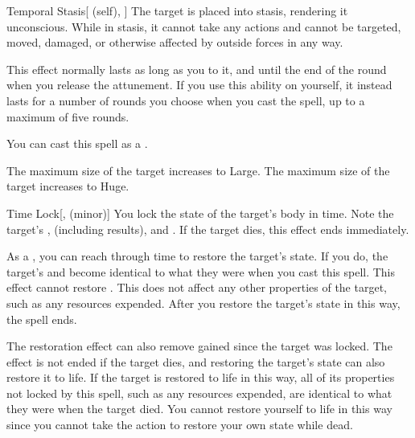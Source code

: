 \lowercase{\hypertarget{spell:Temporal Stasis}{}}\label{spell:Temporal Stasis}
\begin{attuneability}[Rank 4]{\hypertarget{spell:Temporal Stasis}{Temporal Stasis}}[ (self), ]
The target is placed into stasis, rendering it unconscious.
While in stasis, it cannot take any actions and cannot be targeted, moved, damaged, or otherwise affected by outside forces in any way.

This effect normally lasts as long as you  to it, and until the end of the round when you release the attunement.
If you use this ability on yourself, it instead lasts for a number of rounds you choose when you cast the spell, up to a maximum of five rounds.

You can cast this spell as a .

\rankline
{} The maximum size of the target increases to Large.
 The maximum size of the target increases to Huge.

\end{attuneability}
\vspace{0.25em}



\lowercase{\hypertarget{spell:Time Lock}{}}\label{spell:Time Lock}
\begin{freeability}[Rank 4]{\hypertarget{spell:Time Lock}{Time Lock}}[,  (minor)]
You lock the state of the target's body in time.
Note the target's ,  (including  results), and .
If the target dies, this effect ends immediately.

As a , you can reach through time to restore the target's state.
If you do, the target's  and  become identical to what they were when you cast this spell.
This effect cannot restore .
This does not affect any other properties of the target, such as any resources expended.
After you restore the target's state in this way, the spell ends.

\rankline
{} The restoration effect can also remove  gained since the target was locked.
 The effect is not ended if the target dies, and restoring the target's state can also restore it to life.
If the target is restored to life in this way, all of its properties not locked by this spell, such as any resources expended, are identical to what they were when the target died.
You cannot restore yourself to life in this way since you cannot take the action to restore your own state while dead.

\end{freeability}
\vspace{0.25em}



